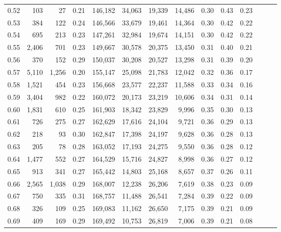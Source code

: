\begin{tabular}{rrrrrrrrrrrrrr}
0.52 &     103 &     27 &  0.21 &  146,182 &   34,063 &  19,339 &  14,486 &  0.30 &  0.43 &      0.23 \\
0.53 &     384 &    122 &  0.24 &  146,566 &   33,679 &  19,461 &  14,364 &  0.30 &  0.42 &      0.22 \\
0.54 &     695 &    213 &  0.23 &  147,261 &   32,984 &  19,674 &  14,151 &  0.30 &  0.42 &      0.22 \\
0.55 &   2,406 &    701 &  0.23 &  149,667 &   30,578 &  20,375 &  13,450 &  0.31 &  0.40 &      0.21 \\
0.56 &     370 &    152 &  0.29 &  150,037 &   30,208 &  20,527 &  13,298 &  0.31 &  0.39 &      0.20 \\
0.57 &   5,110 &  1,256 &  0.20 &  155,147 &   25,098 &  21,783 &  12,042 &  0.32 &  0.36 &      0.17 \\
0.58 &   1,521 &    454 &  0.23 &  156,668 &   23,577 &  22,237 &  11,588 &  0.33 &  0.34 &      0.16 \\
0.59 &   3,404 &    982 &  0.22 &  160,072 &   20,173 &  23,219 &  10,606 &  0.34 &  0.31 &      0.14 \\
0.60 &   1,831 &    610 &  0.25 &  161,903 &   18,342 &  23,829 &   9,996 &  0.35 &  0.30 &      0.13 \\
0.61 &     726 &    275 &  0.27 &  162,629 &   17,616 &  24,104 &   9,721 &  0.36 &  0.29 &      0.13 \\
0.62 &     218 &     93 &  0.30 &  162,847 &   17,398 &  24,197 &   9,628 &  0.36 &  0.28 &      0.13 \\
0.63 &     205 &     78 &  0.28 &  163,052 &   17,193 &  24,275 &   9,550 &  0.36 &  0.28 &      0.12 \\
0.64 &   1,477 &    552 &  0.27 &  164,529 &   15,716 &  24,827 &   8,998 &  0.36 &  0.27 &      0.12 \\
0.65 &     913 &    341 &  0.27 &  165,442 &   14,803 &  25,168 &   8,657 &  0.37 &  0.26 &      0.11 \\
0.66 &   2,565 &  1,038 &  0.29 &  168,007 &   12,238 &  26,206 &   7,619 &  0.38 &  0.23 &      0.09 \\
0.67 &     750 &    335 &  0.31 &  168,757 &   11,488 &  26,541 &   7,284 &  0.39 &  0.22 &      0.09 \\
0.68 &     326 &    109 &  0.25 &  169,083 &   11,162 &  26,650 &   7,175 &  0.39 &  0.21 &      0.09 \\
0.69 &     409 &    169 &  0.29 &  169,492 &   10,753 &  26,819 &   7,006 &  0.39 &  0.21 &      0.08 \\

\end{tabular}
